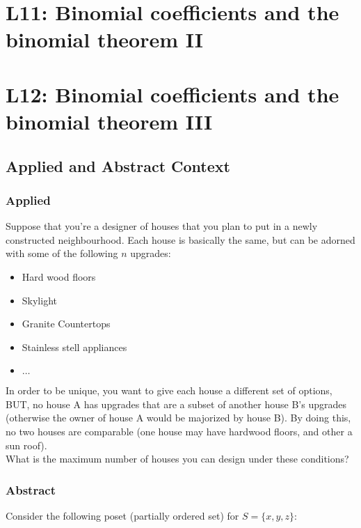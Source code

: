 \documentclass{report}
\begin{document}
\section{L11: Binomial coefficients and the binomial theorem II}



\section{L12: Binomial coefficients and the binomial theorem III}

\subsection*{Applied and Abstract Context}

\subsubsection*{Applied}

Suppose that you're a designer of houses that you plan to put in a newly 
constructed neighbourhood. Each house is basically the same, but can be adorned with 
some of the following $n$ upgrades: 

\begin{itemize}
    \item Hard wood floors 
    \item Skylight
    \item Granite Countertops
    \item Stainless stell appliances
    \item $\dots$
\end{itemize}

\noindent
In order to be unique, you want to give each house a different set of options, BUT, 
no house A has upgrades that are a subset of another house B's upgrades (otherwise 
the owner of house A would be majorized by house B). By doing this, no two houses 
are comparable (one house may have hardwood floors, and other a sun roof). \\

\noindent
What is the maximum number of houses you can design under these conditions?

\subsubsection*{Abstract}

Consider the following poset (partially ordered set) for $S=\{x,y,z\}$: 
\end{document}
